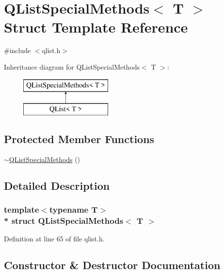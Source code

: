\hypertarget{struct_q_list_special_methods}{}\section{Q\+List\+Special\+Methods$<$ T $>$ Struct Template Reference}
\label{struct_q_list_special_methods}


{\ttfamily \#include $<$qlist.\+h$>$}

Inheritance diagram for Q\+List\+Special\+Methods$<$ T $>$\+:\begin{figure}[H]
\begin{center}
\leavevmode
\includegraphics[height=2.000000cm]{struct_q_list_special_methods}
\end{center}
\end{figure}
\subsection*{Protected Member Functions}
\begin{DoxyCompactItemize}
\item 
\hyperlink{struct_q_list_special_methods_a15e29a889b231d220585ed597e341374}{$\sim$\+Q\+List\+Special\+Methods} ()
\end{DoxyCompactItemize}


\subsection{Detailed Description}
\subsubsection*{template$<$typename T$>$\\*
struct Q\+List\+Special\+Methods$<$ T $>$}



Definition at line 65 of file qlist.\+h.



\subsection{Constructor \& Destructor Documentation}
